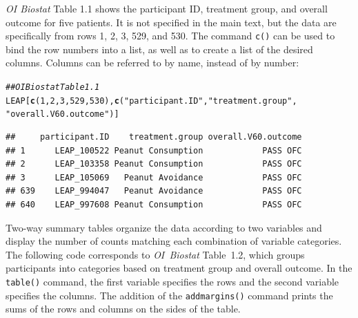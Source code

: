 \documentclass{report}\usepackage[]{graphicx}\usepackage[]{color}
\makeatletter
\newcommand{\hlnum}[1]{\textcolor[rgb]{0.686,0.059,0.569}{#1}}%
\newcommand{\hlstr}[1]{\textcolor[rgb]{0.192,0.494,0.8}{#1}}%
\newcommand{\hlcom}[1]{\textcolor[rgb]{0.678,0.584,0.686}{\textit{#1}}}%
\newcommand{\hlstd}[1]{\textcolor[rgb]{0.345,0.345,0.345}{#1}}%
\newcommand{\hlkwd}[1]{\textcolor[rgb]{0.737,0.353,0.396}{\textbf{#1}}}%
\newenvironment{kframe}{%
 \def\at@end@of@kframe{}%
 \ifinner\ifhmode%
  \def\at@end@of@kframe{\end{minipage}}%
  \begin{minipage}{\columnwidth}%
 \fi\fi%
 \def\FrameCommand##1{\hskip\@totalleftmargin \hskip-\fboxsep
 \colorbox{shadecolor}{##1}\hskip-\fboxsep
     \hskip-\linewidth \hskip-\@totalleftmargin \hskip\columnwidth}%
 \MakeFramed {\advance\hsize-\width
   \@totalleftmargin\z@ \linewidth\hsize
   \@setminipage}}%
 {\par\unskip\endMakeFramed%
 \at@end@of@kframe}
\newenvironment{knitrout}{}{} %
\makeatother
\begin{document}
\textit{OI Biostat} Table 1.1 shows the participant ID, treatment group, and overall outcome for five patients. It is not specified in the main text, but the data are specifically from rows 1, 2, 3, 529, and 530. The command \texttt{c()} can be used to bind the row numbers into a list, as well as to create a list of the desired columns. Columns can be referred to by name, instead of by number:

\begin{knitrout}
\color{fgcolor}\begin{kframe}
\begin{alltt}
\hlcom{## OI Biostat Table 1.1}
\hlstd{LEAP[}\hlkwd{c}\hlstd{(}\hlnum{1}\hlstd{,} \hlnum{2}\hlstd{,} \hlnum{3}\hlstd{,} \hlnum{529}\hlstd{,} \hlnum{530}\hlstd{),}\hlkwd{c}\hlstd{(}\hlstr{"participant.ID"}\hlstd{,} \hlstr{"treatment.group"}\hlstd{,}
                         \hlstr{"overall.V60.outcome"}\hlstd{)]}
\end{alltt}
\begin{verbatim}
##     participant.ID    treatment.group overall.V60.outcome
## 1      LEAP_100522 Peanut Consumption            PASS OFC
## 2      LEAP_103358 Peanut Consumption            PASS OFC
## 3      LEAP_105069   Peanut Avoidance            PASS OFC
## 639    LEAP_994047   Peanut Avoidance            PASS OFC
## 640    LEAP_997608 Peanut Consumption            PASS OFC
\end{verbatim}
\end{kframe}
\end{knitrout}

Two-way summary tables organize the data according to two variables and display the number of counts matching each combination of variable categories. The following code corresponds to \textit{OI~Biostat} Table~1.2, which groups participants into categories based on treatment group and overall outcome. In the \texttt{table()} command, the first variable specifies the rows and the second variable specifies the columns. The addition of the \texttt{addmargins()} command prints the sums of the rows and columns on the sides of the table.
\end{document}
